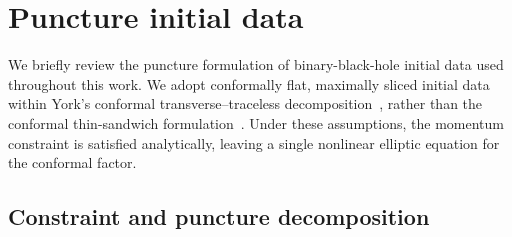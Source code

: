 \documentclass[
  aps,
  prd,
  twocolumn,
  amsmath,
  amssymb,
  nofootinbib,
  superscriptaddress,
  floatfix,
]{revtex4-2}
\begin{document}




\section{Puncture initial data}
\label{sec:problem}
We briefly review the puncture formulation of binary-black-hole initial data used
throughout this work. We adopt conformally flat, maximally sliced initial data
within York's conformal transverse--traceless
decomposition~\cite{York1979,Cook2000}, rather than the conformal thin-sandwich
formulation~\cite{York1999}. Under these assumptions, the momentum constraint is
satisfied analytically, leaving a single nonlinear elliptic equation for the
conformal factor.

\subsection{Constraint and puncture decomposition}
\label{sec:problem:decomp}
\end{document}
